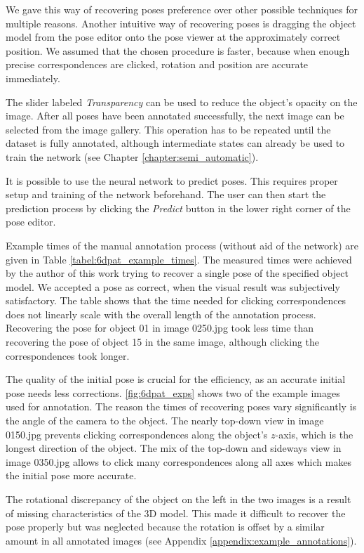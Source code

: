 We gave this way of recovering poses preference over other possible techniques for multiple reasons. Another intuitive way of recovering poses is dragging the object model from the pose editor onto the pose viewer at the approximately correct position. We assumed that the chosen procedure is faster, because when enough precise correspondences are clicked, rotation and position are accurate immediately. 

The slider labeled \textit{Transparency} can be used to reduce the object's opacity on the image. After all poses have been annotated successfully, the next image can be selected from the image gallery. This operation has to be repeated until the dataset is fully annotated, although intermediate states can already be used to train the network (see Chapter \ref{chapter:semi_automatic}).

It is possible to use the neural network to predict poses. This requires proper setup and training of the network beforehand. The user can then start the prediction process by clicking the \textit{Predict} button in the lower right corner of the pose editor.

Example times of the manual annotation process (without aid of the network) are given in Table \ref{tabel:6dpat_example_times}. The measured times were achieved by the author of this work trying to recover a single pose of the specified object model. We accepted a pose as correct, when the visual result was subjectively satisfactory. The table shows that the time needed for clicking correspondences does not linearly scale with the overall length of the annotation process. Recovering the pose for object 01 in image 0250.jpg took less time than recovering the pose of object 15 in the same image, although clicking the correspondences took longer. 

The quality of the initial pose is crucial for the efficiency, as an accurate initial pose needs less corrections. \fig \ref{fig:6dpat_exps} shows two of the example images used for annotation. The reason the times of recovering poses vary significantly is the angle of the camera to the object. The nearly top-down view in image 0150.jpg prevents clicking correspondences along the object's $z$-axis, which is the longest direction of the object. The mix of the top-down and sideways view in image 0350.jpg allows to click many correspondences along all axes which makes the initial pose more accurate. 

The rotational discrepancy of the object on the left in the two images is a result of missing characteristics of the 3D model. This made it difficult to recover the pose properly but was neglected because the rotation is offset by a similar amount in all annotated images (see Appendix \ref{appendix:example_annotations}).


